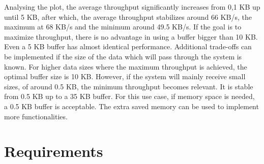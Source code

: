 Analysing the plot, the average throughput significantly increases from 0,1 KB up until 5 KB, after which, the average throughput stabilizes around 66 KB/s, the maximum at 68 KB/s and the minimum around 49.5 KB/s. If the goal is to maximize throughput, there is no advantage in using a buffer bigger than 10 KB. Even a 5 KB buffer has almost identical performance. Additional trade-offs can be implemented if the size of the data which will pass through the system is known. For higher data sizes where the maximum throughput is achieved, the optimal buffer size is 10 KB. However, if the system will mainly receive small sizes, of around 0.5 KB, the minimum throughput becomes relevant. It is stable from 0.5 KB up to a 35 KB buffer. For this use case, if memory space is needed, a 0.5 KB buffer is acceptable. The extra saved memory can be used to implement more functionalities.




\section{Requirements}\label{chap:evaluation:requirements}

